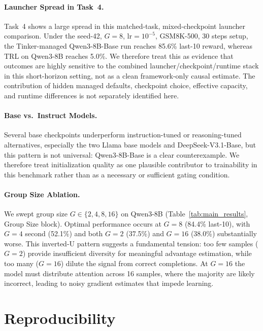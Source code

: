 \documentclass{article}
\begin{document}
\paragraph{Launcher Spread in Task~4.}
Task~4 shows a large spread in this matched-task, mixed-checkpoint launcher
comparison. Under the seed-42, $G=8$, lr$=10^{-5}$, GSM8K-500, 30 steps setup, the Tinker-managed
Qwen3-8B-Base run reaches 85.6\% last-10 reward, whereas TRL on Qwen3-8B
reaches 5.0\%. We therefore treat this as evidence that outcomes are highly
sensitive to the combined launcher/checkpoint/runtime stack in this
short-horizon setting, not as a clean framework-only causal estimate. The
contribution of hidden managed defaults, checkpoint choice, effective
capacity, and runtime differences is not separately identified here.

\paragraph{Base vs.~Instruct Models.}
Several base checkpoints underperform instruction-tuned or reasoning-tuned
alternatives, especially the two Llama base models and DeepSeek-V3.1-Base, but
this pattern is not universal: Qwen3-8B-Base is a clear counterexample. We
therefore treat initialization quality as one plausible contributor to
trainability in this benchmark rather than as a necessary or sufficient gating
condition.

\paragraph{Group Size Ablation.}
We swept group size $G \in \{2, 4, 8, 16\}$ on Qwen3-8B (Table~\ref{tab:main_results}, Group Size block).
Optimal performance occurs at $G{=}8$ (84.4\% last-10), with $G{=}4$ second (52.1\%) and both $G{=}2$ (37.5\%) and $G{=}16$ (38.0\%) substantially worse.
This inverted-U pattern suggests a fundamental tension: too few samples ($G{=}2$) provide insufficient diversity for meaningful advantage estimation, while too many ($G{=}16$) dilute the signal from correct completions.
At $G{=}16$ the model must distribute attention across 16 samples, where the majority are likely incorrect, leading to noisy gradient estimates that impede learning.

\section{Reproducibility}
\label{sec:reproducibility}
\end{document}

